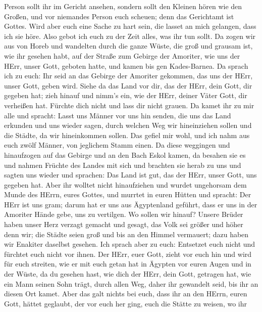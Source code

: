 Person sollt ihr im Gericht ansehen, sondern sollt den Kleinen hören wie
den Großen, und vor niemandes Person euch scheuen; denn das Gerichtamt
ist Gottes. Wird aber euch eine Sache zu hart sein, die lasset an mich
gelangen, dass ich sie höre.  Also gebot ich euch zu der
Zeit alles, was ihr tun sollt.  Da zogen wir aus von Horeb
und wandelten durch die ganze Wüste, die groß und grausam ist, wie ihr
gesehen habt, auf der Straße zum Gebirge der Amoriter, wie uns der HErr,
unser Gott, geboten hatte, und kamen bis gen Kades-Barnea. 
Da sprach ich zu euch: Ihr seid an das Gebirge der Amoriter gekommen,
das uns der HErr, unser Gott, geben wird.  Siehe da das
Land vor dir, das der HErr, dein Gott, dir gegeben hat; zieh hinauf und
nimm's ein, wie der HErr, deiner Väter Gott, dir verheißen hat. Fürchte
dich nicht und lass dir nicht grauen.  Da kamet ihr zu mir
alle und spracht: Lasst uns Männer vor uns hin senden, die uns das Land
erkunden und uns wieder sagen, durch welchen Weg wir hineinziehen sollen
und die Städte, da wir hineinkommen sollen.  Das gefiel mir
wohl, und ich nahm aus euch zwölf Männer, von jeglichem Stamm einen.
 Da diese weggingen und hinaufzogen auf das Gebirge und an
den Bach Eskol kamen, da besahen sie es  und nahmen Früchte
des Landes mit sich und brachten sie herab zu uns und sagten uns wieder
und sprachen: Das Land ist gut, das der HErr, unser Gott, uns gegeben
hat.  Aber ihr wolltet nicht hinaufziehen und wurdet
ungehorsam dem Munde des HErrn, eures Gottes,  und murrtet
in euren Hütten und spracht: Der HErr ist uns gram; darum hat er uns aus
Ägyptenland geführt, dass er uns in der Amoriter Hände gebe, uns zu
vertilgen.  Wo sollen wir hinauf? Unsere Brüder haben unser
Herz verzagt gemacht und gesagt, das Volk sei größer und höher denn wir;
die Städte seien groß und bis an den Himmel vermauert; dazu haben wir
Enakiter daselbst gesehen.  Ich sprach aber zu euch:
Entsetzet euch nicht und fürchtet euch nicht vor ihnen. 
Der HErr, euer Gott, zieht vor euch hin und wird für euch streiten, wie
er mit euch getan hat in Ägypten vor euren Augen  und in
der Wüste, da du gesehen hast, wie dich der HErr, dein Gott, getragen
hat, wie ein Mann seinen Sohn trägt, durch allen Weg, daher ihr
gewandelt seid, bis ihr an diesen Ort kamet.  Aber das galt
nichts bei euch, dass ihr an den HErrn, euren Gott, hättet geglaubt,
 der vor euch her ging, euch die Stätte zu weisen, wo ihr
